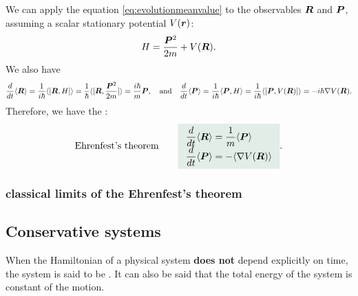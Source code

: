 We can apply the equation \eqref{eq:evolutionmeanvalue} to the observables $\bm{R}$ and $\bm{P}$, assuming a scalar stationary potential $V(\bm{r})$:
\begin{align*}
    H=\frac{\bm{P}^2}{2m}+V(\bm{R}).
\end{align*}
We also have
\begin{align*}
    \frac{d}{dt}\langle\bm{R}\rangle=\frac{1}{i\hbar}\langle[\bm{R},H]\rangle=\frac{1}{\hbar}\langle[\bm{R},\frac{\bm{P}^2}{2m}]\rangle=\frac{i\hbar}{m}\bm{P},\quad\text{and}\quad\frac{d}{dt}\langle\bm{P}\rangle=\frac{1}{i\hbar}\langle\bm{P},H\rangle=\frac{1}{i\hbar}\langle[\bm{P},V(\bm{R})]\rangle=-i\hbar\nabla V(\bm{R}).
\end{align*}
Therefore, we have the :
\begin{align}
    \text{Ehrenfest's theorem}\qquad\highlight{\begin{array}{l}
        \displaystyle\frac{d}{dt}\braket{\BR}=\frac{1}{m}\braket{\BP}\\
        \displaystyle\frac{d}{dt}\braket{\BP}=-\braket{\nabla V(\BR)}
    \end{array}}.
\end{align}

\subsubsection{classical limits of the Ehrenfest's theorem}

\subsection{Conservative systems}
When the Hamiltonian of a physical system \textbf{does not} depend explicitly on time, the system is said to be .
It can also be said that the total energy of the system is constant of the motion. 
%
